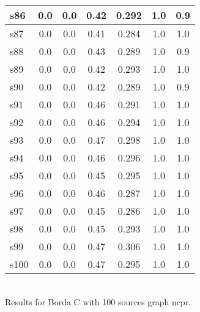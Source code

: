 \documentclass{article}
\begin{document}
\begin{tabular}{|l|c|c|c|c|c|c|}
\hline
s86 &0.0 & 0.0 & 0.42 & 0.292 & 1.0 & 0.9\\
\hline
s87 &0.0 & 0.0 & 0.41 & 0.284 & 1.0 & 1.0\\
\hline
s88 &0.0 & 0.0 & 0.43 & 0.289 & 1.0 & 0.9\\
\hline
s89 &0.0 & 0.0 & 0.42 & 0.293 & 1.0 & 1.0\\
\hline
s90 &0.0 & 0.0 & 0.42 & 0.289 & 1.0 & 0.9\\
\hline
s91 &0.0 & 0.0 & 0.46 & 0.291 & 1.0 & 1.0\\
\hline
s92 &0.0 & 0.0 & 0.46 & 0.294 & 1.0 & 1.0\\
\hline
s93 &0.0 & 0.0 & 0.47 & 0.298 & 1.0 & 1.0\\
\hline
s94 &0.0 & 0.0 & 0.46 & 0.296 & 1.0 & 1.0\\
\hline
s95 &0.0 & 0.0 & 0.45 & 0.295 & 1.0 & 1.0\\
\hline
s96 &0.0 & 0.0 & 0.46 & 0.287 & 1.0 & 1.0\\
\hline
s97 &0.0 & 0.0 & 0.45 & 0.286 & 1.0 & 1.0\\
\hline
s98 &0.0 & 0.0 & 0.45 & 0.293 & 1.0 & 1.0\\
\hline
s99 &0.0 & 0.0 & 0.47 & 0.306 & 1.0 & 1.0\\
\hline
s100 &0.0 & 0.0 & 0.47 & 0.295 & 1.0 & 1.0\\
\hline
\end{tabular}\\

\noindent Results for Borda C with 100 sources graph ncpr.
\end{document}
